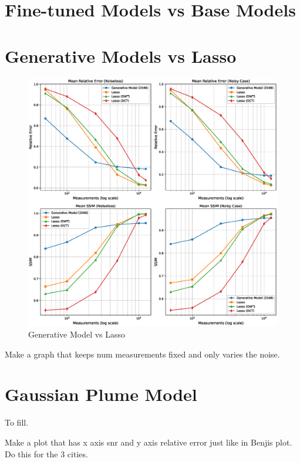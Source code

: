 \section{Fine-tuned Models vs Base Models}
\section{Generative Models vs Lasso}
\begin{figure}[h!]
    \centering
    \includegraphics[width=\textwidth]{figures/06_results/gen_vs_lasso.eps}
    \caption{Generative Model vs Lasso}
\end{figure}
Make a graph that keeps num measurements fixed and only varies the noise.

\section{Gaussian Plume Model}
To fill.

Make a plot that has x axis snr and y axis relative error just like in Benjis plot.
Do this for the 3 cities.
